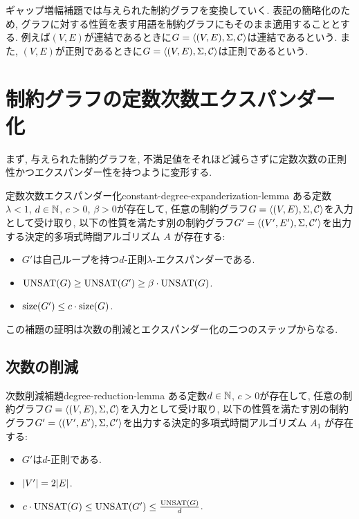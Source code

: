 ギャップ増幅補題では与えられた制約グラフを変換していく.
表記の簡略化のため, グラフに対する性質を表す用語を制約グラフにもそのまま適用することとする.
例えば$(V,E)$が連結であるときに$G=\langle(V,E),\Sigma,\mathcal{C}\rangle$は連結であるという.
また, $(V,E)$が正則であるときに$G=\langle(V,E),\Sigma,\mathcal{C}\rangle$は正則であるという.


\section{制約グラフの定数次数エクスパンダー化}

まず, 与えられた制約グラフを, 不満足値をそれほど減らさずに定数次数の正則性かつエクスパンダー性を持つように変形する.

\begin{lemma}{定数次数エクスパンダー化}{constant-degree-expanderization-lemma}
  ある定数$\lambda<1$, $d\in\mathbb{N}$, $c>0$, $\beta>0$が存在して,
  任意の制約グラフ$G=\langle(V,E),\Sigma,\mathcal{C}\rangle$を入力として受け取り, 以下の性質を満たす別の制約グラフ$G'=\langle(V',E'),\Sigma,\mathcal{C}'\rangle$を出力する決定的多項式時間アルゴリズム $A$ が存在する:
  \begin{itemize}
    \item $G'$は自己ループを持つ$d$-正則$\lambda$-エクスパンダーである.
    \item $\mathrm{UNSAT}(G) \ge \mathrm{UNSAT}(G') \ge \beta\cdot\mathrm{UNSAT}(G)$.
    \item $\mathrm{size}(G') \le c\cdot \mathrm{size}(G)$.
  \end{itemize}
\end{lemma}

この補題の証明は次数の削減とエクスパンダー化の二つのステップからなる.

\subsection{次数の削減}

\begin{lemma}{次数削減補題}{degree-reduction-lemma}
  ある定数$d\in\mathbb{N}$, $c>0$が存在して, 任意の制約グラフ$G=\langle(V,E),\Sigma,\mathcal{C}\rangle$を入力として受け取り, 以下の性質を満たす別の制約グラフ$G'=\langle(V',E'),\Sigma,\mathcal{C}'\rangle$を出力する決定的多項式時間アルゴリズム $A_1$ が存在する:
  \begin{itemize}
    \item $G'$は$d$-正則である.
    \item $\abs{V'} = 2\abs{E}$.
    \item $c \cdot \mathrm{UNSAT}(G) \le \mathrm{UNSAT}(G') \le \frac{\mathrm{UNSAT}(G)}{d}$.
  \end{itemize}
\end{lemma}

